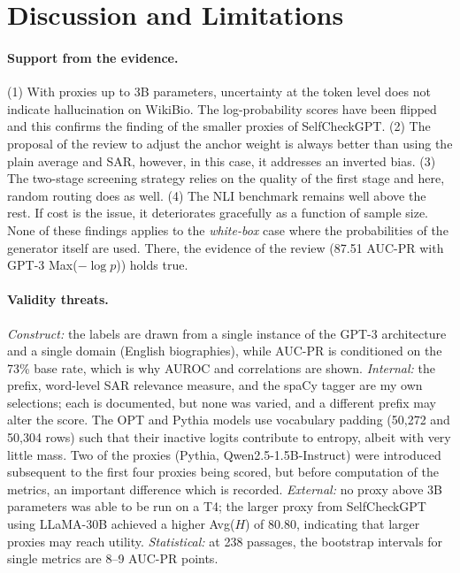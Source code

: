 \documentclass[acmsmall,screen,review,nonacm]{acmart}
\begin{document}
\section{Discussion and Limitations}
\label{sec:discussion}

\paragraph{Support from the evidence.} (1) With proxies up to 3B parameters, uncertainty at the token level does not indicate hallucination on WikiBio. The log-probability scores have been flipped and this confirms the finding of the smaller proxies of SelfCheckGPT. (2) The proposal of the review to adjust the anchor weight is always better than using the plain average and SAR, however, in this case, it addresses an inverted bias. (3) The two-stage screening strategy relies on the quality of the first stage and here, random routing does as well. (4) The NLI benchmark remains well above the rest. If cost is the issue, it deteriorates gracefully as a function of sample size. None of these findings applies to the \emph{white-box} case where the probabilities of the generator itself are used. There, the evidence of the review (87.51 AUC-PR with GPT-3 Max($-\log p$)) holds true.

\paragraph{Validity threats.} \emph{Construct:} the labels are drawn from a single instance of the GPT-3 architecture and a single domain (English biographies), while AUC-PR is conditioned on the 73\% base rate, which is why AUROC and correlations are shown. \emph{Internal:} the prefix, word-level SAR relevance measure, and the spaCy tagger are my own selections; each is documented, but none was varied, and a different prefix may alter the score. The OPT and Pythia models use vocabulary padding (50{,}272 and 50{,}304 rows) such that their inactive logits contribute to entropy, albeit with very little mass. Two of the proxies (Pythia, Qwen2.5-1.5B-Instruct) were introduced subsequent to the first four proxies being scored, but before computation of the metrics, an important difference which is recorded. \emph{External:} no proxy above 3B parameters was able to be run on a T4; the larger proxy from SelfCheckGPT using LLaMA-30B achieved a higher Avg($H$) of 80.80, indicating that larger proxies may reach utility. \emph{Statistical:} at 238 passages, the bootstrap intervals for single metrics are 8--9 AUC-PR points.
\end{document}

